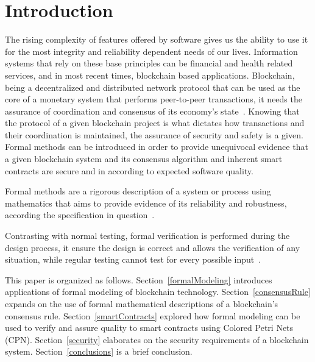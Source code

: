 \documentclass[sigconf, nonacm]{acmart}
\begin{document}


\maketitle

\section{Introduction}
The rising complexity of features offered by software gives us the ability to use it for the most integrity and reliability dependent needs of our lives. 
Information systems that rely on these base principles can be financial and health related services, and in most recent times, blockchain based applications. 
Blockchain, being a decentralized and distributed network protocol that can be used as the core of a monetary system that performs peer-to-peer transactions, 
it needs the assurance of coordination and consensus of its economy’s state~\cite{Duan2018}. 
Knowing that the protocol of a given blockchain project is what dictates how transactions and their coordination is maintained, the assurance of security and safety is a given. 
Formal methods can be introduced in order to provide unequivocal evidence that a given blockchain system and its consensus algorithm and inherent smart contracts are secure and in according to expected software quality.

Formal methods are a rigorous description of a system or process using mathematics that aims to provide evidence of its reliability and robustness, 
according the specification in question~\cite{Regan2014}.

Contrasting with normal testing, formal verification is performed during the design process, it ensure the design is correct and allows the verification
of any situation, while regular testing cannot test for every possible input~\cite{Murray2019}.

This paper is organized as follows. Section~\ref{formalModeling} introduces applications of formal modeling of blockchain technology.
Section~\ref{consensusRule} expands on the use of formal mathematical descriptions of a blockchain's consensus rule.
Section~\ref{smartContracts} explored how formal modeling can be used to verify and assure quality to smart contracts using Colored Petri Nets (CPN).
Section~\ref{security} elaborates on the security requirements of a blockchain system.
Section~\ref{conclusions} is a brief conclusion.
\end{document}
